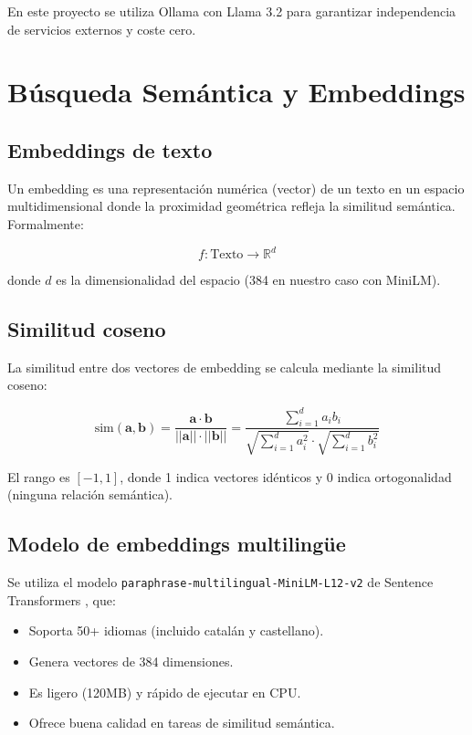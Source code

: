 \documentclass[12pt, a4paper, twoside]{report}
\begin{document}
En este proyecto se utiliza Ollama con Llama 3.2 para garantizar independencia de servicios externos y coste cero.

\section{B\'usqueda Sem\'antica y Embeddings}

\subsection{Embeddings de texto}

Un embedding es una representaci\'on num\'erica (vector) de un texto en un espacio multidimensional donde la proximidad geom\'etrica refleja la similitud sem\'antica. Formalmente:

\begin{equation}
  f: \text{Texto} \rightarrow \mathbb{R}^d
\end{equation}

donde $d$ es la dimensionalidad del espacio (384 en nuestro caso con MiniLM).

\subsection{Similitud coseno}

La similitud entre dos vectores de embedding se calcula mediante la similitud coseno:

\begin{equation}
  \text{sim}(\mathbf{a}, \mathbf{b}) = \frac{\mathbf{a} \cdot \mathbf{b}}{||\mathbf{a}|| \cdot ||\mathbf{b}||} = \frac{\sum_{i=1}^{d} a_i b_i}{\sqrt{\sum_{i=1}^{d} a_i^2} \cdot \sqrt{\sum_{i=1}^{d} b_i^2}}
\end{equation}

El rango es $[-1, 1]$, donde 1 indica vectores id\'enticos y 0 indica ortogonalidad (ninguna relaci\'on sem\'antica).

\subsection{Modelo de embeddings multiling\"ue}

Se utiliza el modelo \texttt{paraphrase-multilingual-MiniLM-L12-v2} de Sentence Transformers \cite{reimers2019}, que:

\begin{itemize}
  \item Soporta 50+ idiomas (incluido catal\'an y castellano).
  \item Genera vectores de 384 dimensiones.
  \item Es ligero (120MB) y r\'apido de ejecutar en CPU.
  \item Ofrece buena calidad en tareas de similitud sem\'antica.
\end{itemize}
\end{document}
